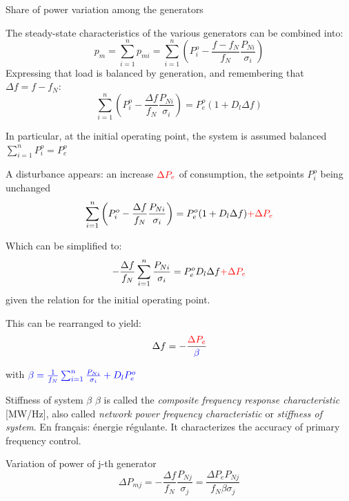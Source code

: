 \begin{frame}[allowframebreaks]{Share of power variation among the generators}
  
  The steady-state characteristics of the various generators can be combined into: 
  $$p_m = \sum_{i=1}^n p_{mi} = \sum_{i=1}^n \left( P_i^o - \frac{f - f_N}{f_N} \frac{P_{Ni}}{\sigma_i} \right)$$
  Expressing that load is balanced by generation, and remembering that $\Delta f = f - f_N$:
  $$\sum_{i=1}^n \left( P_i^o - \frac{\Delta f}{f_N} \frac{P_{Ni}}{\sigma_i} \right) = P_e^o (1 + D_l \Delta f)$$
  
  
  In particular, at the initial operating point, the system is assumed balanced $\sum_{i=1}^n P_i^o = P_e^o$ 
  
  A disturbance appears: an increase $\color{red}{\Delta P_e}$ of consumption, the setpoints $P_i^o$ being unchanged 
  $$\sum_{i=1}^n \left( P_i^o - \frac{\Delta f}{f_N} \frac{P_{Ni}}{\sigma_i} \right) = P_e^o (1 + D_l \Delta f) \color{red}{+ \Delta P_e}$$
  
  Which can be simplified to:
  $$-\frac{\Delta f}{f_N} \sum_{i=1}^n \frac{P_{Ni}}{\sigma_i} = P_e^o D_l \Delta f  \color{red}{+ \Delta P_e}$$
  given the relation for the initial operating point.
  
  This can be rearranged to yield:
  $$\Delta f = -\frac{\color{red}{\Delta P_e}}{\color{blue}{\beta}}$$

  with $\color{blue}{\beta} = \frac{1}{f_N} \sum_{i=1}^n \frac{P_{Ni}}{\sigma_i} +  D_l P_e^o$ 

  \begin{block}{Stiffness of system $\beta$}
    $\beta$ is called the \textit{composite frequency response characteristic} [MW/Hz], also called \textit{network power frequency characteristic} or \textit{stiffness of system}. En français: énergie régulante.
    It characterizes the accuracy of primary frequency control.
  \end{block}

  \begin{block}{Variation of power of j-th generator}
    $$\Delta P_{mj} = -\frac{\Delta f}{f_N} \frac{P_{Nj}}{ \sigma_j} = \frac{\Delta P_e P_{Nj}}{f_N \beta \sigma_j}$$
    \end{block}
            

\end{frame}
